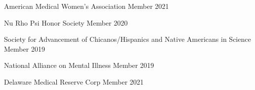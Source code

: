 


\begin{cvhonors}

  \cvhonor
    {American Medical Women's Association} %
    {Member} %
    {} %
    {2021} %

  \cvhonor
    {Nu Rho Psi Honor Society} %
    {Member} %
    {} %
    {2020} %

  \cvhonor
    {Society for Advancement of Chicanos/Hispanics and Native Americans in Science} %
    {Member} %
    {} %
    {2019} %
    
  \cvhonor
    {National Alliance on Mental Illness} %
    {Member} %
    {} %
    {2019} %

\end{cvhonors}



\begin{cvhonors}

  \cvhonor
    {Delaware Medical Reserve Corp} %
    {Member} %
    {} %
    {2021} %

\end{cvhonors}
